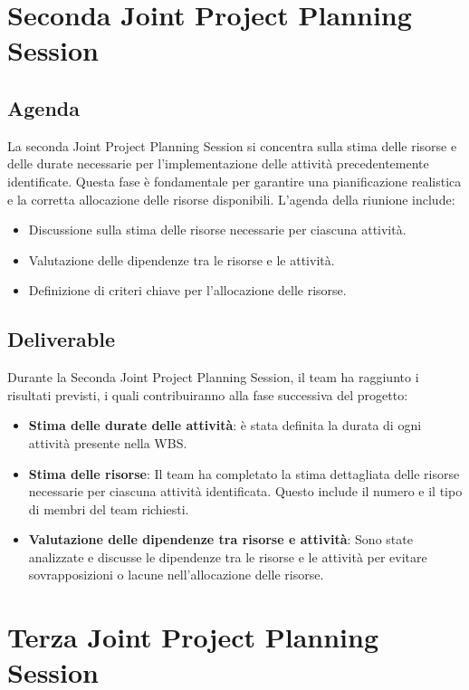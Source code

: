 \section{Seconda Joint Project Planning Session}

\subsection{Agenda}

La seconda Joint Project Planning Session si concentra sulla stima delle risorse e delle durate necessarie per l'implementazione delle attività precedentemente identificate. Questa fase è fondamentale per garantire una pianificazione realistica e la corretta allocazione delle risorse disponibili. L'agenda della riunione include:

\begin{itemize}
    \item Discussione sulla stima delle risorse necessarie per ciascuna attività.
    \item Valutazione delle dipendenze tra le risorse e le attività.
    \item Definizione di criteri chiave per l'allocazione delle risorse.
\end{itemize}

\subsection{Deliverable}

Durante la Seconda Joint Project Planning Session, il team ha raggiunto i risultati previsti, i quali contribuiranno alla fase successiva del progetto:

\begin{itemize}
    \item \textbf{Stima delle durate delle attività}: è stata definita la durata di ogni attività presente nella WBS.
    \item \textbf{Stima delle risorse}: Il team ha completato la stima dettagliata delle risorse necessarie per ciascuna attività identificata. Questo include il numero e il tipo di membri del team richiesti.
    \item \textbf{Valutazione delle dipendenze tra risorse e attività}: Sono state analizzate e discusse le dipendenze tra le risorse e le attività per evitare sovrapposizioni o lacune nell'allocazione delle risorse.
\end{itemize}

\section{Terza Joint Project Planning Session}

